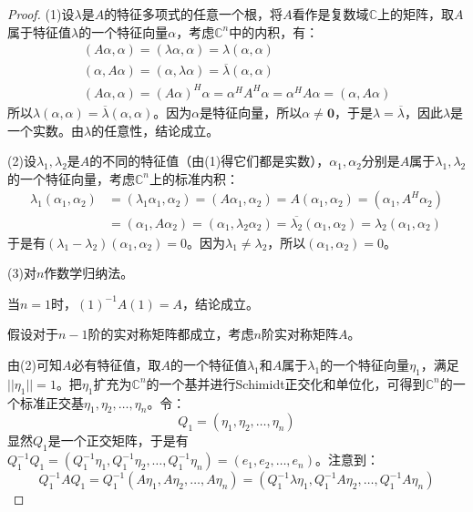 \begin{proof}
	(1)设$\lambda$是$A$的特征多项式的任意一个根，将$A$看作是复数域$\mathbb{C}$上的矩阵，取$A$属于特征值$\lambda$的一个特征向量$\alpha$，考虑$\mathbb{C}^{n}$中的内积，有：
	\begin{gather*}
		(A\alpha,\alpha)=(\lambda\alpha,\alpha)=\lambda(\alpha,\alpha) \\
		(\alpha,A\alpha)=(\alpha,\lambda\alpha)=\overline{\lambda}(\alpha,\alpha) \\
		(A\alpha,\alpha)=(A\alpha)^H\alpha=\alpha^HA^H\alpha=\alpha^H A\alpha=(\alpha,A\alpha)
	\end{gather*}
	所以$\lambda(\alpha,\alpha)=\overline{\lambda}(\alpha,\alpha)$。因为$\alpha$是特征向量，所以$\alpha\ne\mathbf{0}$，于是$\lambda=\overline{\lambda}$，因此$\lambda$是一个实数。由$\lambda$的任意性，结论成立。\par
	(2)设$\lambda_1,\lambda_2$是$A$的不同的特征值（由(1)得它们都是实数），$\alpha_1,\alpha_2$分别是$A$属于$\lambda_1,\lambda_2$的一个特征向量，考虑$\mathbb{C}^{n}$上的标准内积：
	\begin{align*}
		\lambda_1(\alpha_1,\alpha_2)
		&=(\lambda_1\alpha_1,\alpha_2)=(A\alpha_1,\alpha_2)
		=A(\alpha_1,\alpha_2)=(\alpha_1,A^H\alpha_2) \\
		&=(\alpha_1,A\alpha_2)=(\alpha_1,\lambda_2\alpha_2)=\overline{\lambda_2}(\alpha_1,\alpha_2)=\lambda_2(\alpha_1,\alpha_2)
	\end{align*}
	于是有$(\lambda_1-\lambda_2)(\alpha_1,\alpha_2)=0$。因为$\lambda_1\ne\lambda_2$，所以$(\alpha_1,\alpha_2)=0$。\par
	(3)对$n$作数学归纳法。\par
	当$n=1$时，$(1)^{-1}A(1)=A$，结论成立。\par
	假设对于$n-1$阶的实对称矩阵都成立，考虑$n$阶实对称矩阵$A$。\par
	由(2)可知$A$必有特征值，取$A$的一个特征值$\lambda_1$和$A$属于$\lambda_1$的一个特征向量$\eta_1$，满足$||\eta_1||=1$。把$\eta_1$扩充为$\mathbb{C}^{n}$的一个基并进行Schimidt正交化和单位化，可得到$\mathbb{C}^{n}$的一个标准正交基$\eta_1,\eta_2,\dots,\eta_n$。令：
	\begin{equation*}
		Q_1=(\eta_1,\eta_2,\dots,\eta_n)
	\end{equation*}
	显然$Q_1$是一个正交矩阵，于是有$Q_1^{-1}Q_1=(Q_1^{-1}\eta_1,Q_1^{-1}\eta_2,\dots,Q_1^{-1}\eta_n)=(e_1,e_2,\dots,e_n)$。注意到：
	\begin{equation*}
		Q_1^{-1}AQ_1=Q_1^{-1}(A\eta_1,A\eta_2,\dots,A\eta_n)=(Q_1^{-1}\lambda\eta_1,Q_1^{-1}A\eta_2,\dots,Q_1^{-1}A\eta_n)

\end{equation*}
\end{proof}
